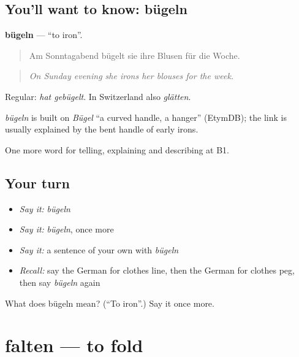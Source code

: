 \subsection*{You'll want to know: bügeln}
\textbf{bügeln} — \textquotedblleft{}to iron\textquotedblright{}.

\begin{quote}
Am Sonntagabend bügelt sie ihre Blusen für die Woche.
\end{quote}

\begin{quote}
\emph{On Sunday evening she irons her blouses for the week.}
\end{quote}

Regular: \emph{hat gebügelt}. In Switzerland also \emph{glätten}.

\begin{cousinweb}
\emph{bügeln} is built on \emph{Bügel} \textquotedblleft{}a curved handle, a hanger\textquotedblright{} (EtymDB); the link is usually explained by the bent handle of early irons.
\end{cousinweb}

\begin{grammarlens}[title={What you've built}]
One more word for telling, explaining and describing at B1.
\end{grammarlens}

\subsection*{Your turn}
\begin{itemize}
\raggedright
  \item \emph{Say it:} \emph{bügeln}
  \item \emph{Say it:} \emph{bügeln}, once more
  \item \emph{Say it:} a sentence of your own with \emph{bügeln}
  \item \emph{Recall:} say the German for clothes line, then the German for clothes peg, then say \emph{bügeln} again
\end{itemize}

\begin{tcolorbox}[breakable,colback=teal!4,colframe=teal!35!black,title={Before you move on}]
What does bügeln mean? (\textquotedblleft{}To iron\textquotedblright{}.) Say it once more.
\end{tcolorbox}
\section[falten]{falten — to fold}


